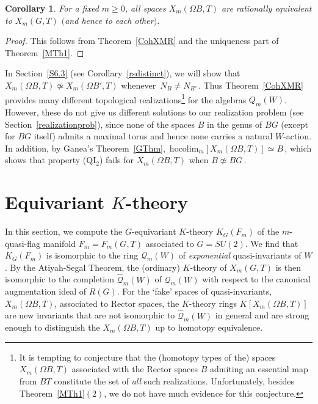 \documentclass[11pt]{amsart}
\newtheorem{cor}[theorem]{Corollary}
\theoremstyle{definition}
\theoremstyle{remark}
\numberwithin{equation}{section}
\newcommand{\la}{\label}
\newcommand{\hocolim}{\mathrm{hocolim}}
\def\cQ{\mathcal{Q}}
\begin{document}
%
\begin{cor}
\la{Cor5.8}
For a fixed $m\ge0$, all spaces $ X_m(\Omega B, T) $ are rationally  equivalent to $X_m(G,T)$ $($and hence to each other$)$.
\end{cor}
%
\begin{proof}
This follows from Theorem~\ref{CohXMR} and the uniqueness part of Theorem~\ref{MTh1}.
\end{proof}
%
In Section~\ref{S6.3} (see Corollary~\ref{rsdistinct}), 
we will show that $ X_m(\Omega B, T) \not\simeq X_m(\Omega B', T) $ whenever $\, N_B \not= N_{B'} \,$. Thus Theorem~\ref{CohXMR} provides many different topological realizations\footnote{It is tempting to conjecture that the (homotopy types of the) spaces $ X_m(\Omega B, T) $ associated with the Rector spaces $B$ admiting an essential map from $BT$ constitute the set of {\it all} such realizations. Unfortunately, besides Theorem~\ref{MTh1}$(2)$, we do not have much evidence for this conjecture.} for the algebras $Q_m(W)$. 
However, these do not give us different solutions to our realization problem (see Section~\ref{realizationprob}), since none of the spaces $ B $ in the genus of $BG$ (except for $BG$ itself) admits a maximal torus and hence none carries a natural $W$-action. In addition, by Ganea's Theorem~\ref{GThm}, 
$\, \hocolim_{m}[X_m(\Omega B, T)] \simeq B \,$, which shows that property (QI$_{2}$)
  fails for $ X_m(\Omega B, T)$  
when $ B \not\simeq BG\,$.

\section{Equivariant $K$-theory}
\la{S6}
In this section, we compute the $G$-equivariant $K$-theory $ K_G(F_m) $ of the $m$-quasi-flag manifold $F_m = F_m(G,T) $ associated to $ G = SU(2)$. We find that $ K_G(F_m) $  is isomorphic to the ring $ \cQ_m(W) $ of {\it exponential} quasi-invariants of $W$. By the Atiyah-Segal Theorem, the (ordinary) $K$-theory of $X_m(G,T) $ is then isomorphic to the completion $\widehat{\cQ}_m(W)$ of $ \cQ_m(W) $ with respect to the canonical augmentation ideal of $R(G)$. For the `fake' spaces of quasi-invariants, $ X_m(\Omega B, T)$, associated to Rector spaces, the $K$-theory rings $ K[X_m(\Omega B, T)] $ are new invariants that are not isomorphic to $\widehat{\cQ}_m(W) $ in general and are strong enough to distinguish the $ X_m(\Omega B, T)$ up to homotopy equivalence.
%
\end{document}
